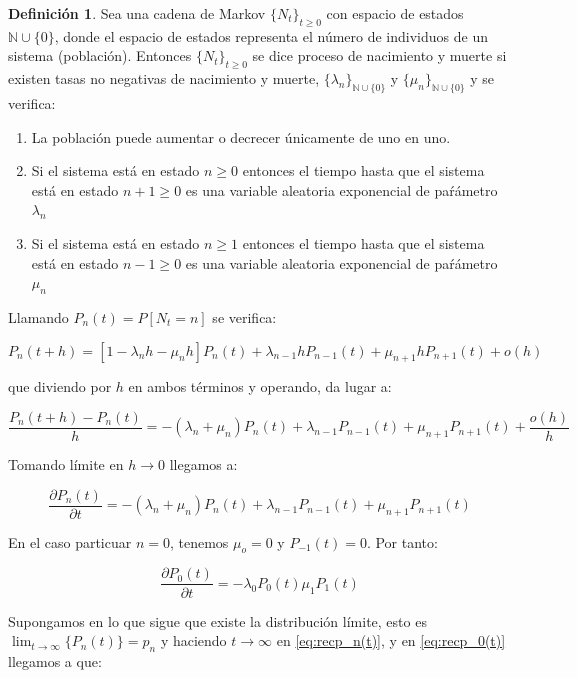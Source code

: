 \documentclass[a4paper,10pt]{scrartcl}
\theoremstyle{definition}
\newtheorem*{mydef}{Definición}
\numberwithin{equation}{section}
\begin{document}
\begin{mydef}
 Sea una cadena de Markov $\{N_t\}_{t\ge 0}$ con espacio de estados $\mathbb{N}\cup \{0\}$, donde el espacio de estados representa el número de individuos
 de un sistema (población). Entonces $\{N_t\}_{t\ge 0}$ se dice proceso de nacimiento y muerte si existen tasas no negativas de nacimiento y muerte,
 $\{\lambda_n\}_{\mathbb{N}\cup \{0\}}$ y $\{\mu_n\}_{\mathbb{N}\cup \{0\}}$ y se verifica:
 
 \begin{enumerate}
  \item La población puede aumentar o decrecer únicamente de uno en uno.
  \item Si el sistema está en estado $n\ge 0$ entonces el tiempo hasta que el sistema está en estado $n+1 \ge 0$ es una variable aleatoria exponencial
  de paŕámetro $\lambda_n$
  \item Si el sistema está en estado $n\ge 1$ entonces el tiempo hasta que el sistema está en estado $n-1 \ge 0$ es una variable aleatoria exponencial
  de paŕámetro $\mu_n$
 \end{enumerate}
\end{mydef}

Llamando $P_n(t) = P[N_t = n]$ se verifica:

\[P_n(t+h) = [1-\lambda_n h -\mu_n h] P_n(t) + \lambda_{n-1} h P_{n-1}(t) + \mu_{n+1} h P_{n+1}(t) + o(h)\]

que diviendo por $h$ en ambos términos y operando, da lugar a:

\[\frac{P_n(t+h) - P_n(t)}{h} = -(\lambda_n + \mu_n) P_n(t) + \lambda_{n-1} P_{n-1}(t) + \mu_{n+1}P_{n+1}(t) + \frac{o(h)}{h}\]

Tomando límite en $h\rightarrow 0$ llegamos a:

\begin{equation}
\frac{\partial P_n(t)}{\partial t} = -(\lambda_n + \mu_n) P_n(t) + \lambda_{n-1}P_{n-1}(t) + \mu_{n+1}P_{n+1}(t)
\label{eq:recp_n(t)}
\end{equation}

En el caso particuar $n=0$, tenemos $\mu_o = 0$ y $P_{-1}(t) = 0$. Por tanto:

\begin{equation}
 \frac{\partial P_0(t)}{\partial t} = -\lambda_0 P_0(t) \mu_{1}P_{1}(t)
 \label{eq:recp_0(t)}
\end{equation}


Supongamos en lo que sigue que existe la distribución límite, esto es 
$\lim_{t\rightarrow \infty}\{P_n(t)\} = p_n$ y haciendo $t\rightarrow \infty$ en \eqref{eq:recp_n(t)},
y en \eqref{eq:recp_0(t)} llegamos a que:
\end{document}
